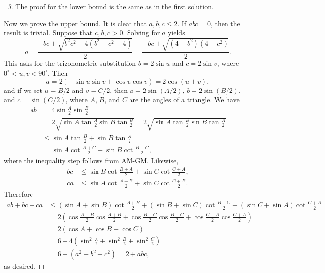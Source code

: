 \documentclass[12pt]{article}
\begin{document}
$$$$

\begin{proof}[\proofname\ 3]
 
The proof for the lower bound is the same as in the first solution.

Now we prove the upper bound. It is clear that $a,b,c\leq 2$. If $abc = 0$, then the result is trivial. Suppose that $a,b,c > 0$. Solving for $a$ yields
$$a = \frac{-bc + \sqrt{b^2c^2 - 4(b^2 + c^2 - 4)}}{2} = \frac{-bc + \sqrt{(4 - b^2)(4 - c^2)}}{2}.$$
This asks for the trigonometric substitution $b = 2\sin u$ and $c = 2\sin v$, where $0^\circ < u,v < 90^\circ$. Then
$$a = 2(-\sin u\sin v + \cos u\cos v) = 2\cos (u + v),$$
and if we set $u = B/2$ and $v = C/2$, then $a = 2\sin (A/2)$, $b = 2\sin (B/2)$, and $c = \sin (C/2)$, where $A$, $B$, and $C$ are the angles of a triangle. We have
$$\begin{align*}
ab &= 4\sin\frac{A}{2}\sin\frac{B}{2} \\
&= 2\sqrt{\sin A\tan\frac{A}{2}\sin B\tan\frac{B}{2}} = 2\sqrt{\sin A\tan\frac{B}{2}\sin B\tan\frac{A}{2}} \\
&\leq \sin A\tan\frac{B}{2} + \sin B\tan\frac{A}{2} \\
&= \sin A\cot\frac{A + C}{2} + \sin B\cot\frac{B + C}{2},
\end{align*}$$
where the inequality step follows from AM-GM. Likewise,
$$\begin{align*}
bc &\leq \sin B\cot\frac{B + A}{2} + \sin C\cot\frac{C + A}{2}, \\
ca &\leq \sin A\cot\frac{A + B}{2} + \sin C\cot\frac{C + B}{2}.
\end{align*}$$
Therefore
$$\begin{align*}
ab + bc + ca &\leq (\sin A + \sin B)\cot\frac{A + B}{2} + (\sin B + \sin C)\cot\frac{B + C}{2} + (\sin C + \sin A)\cot\frac{C + A}{2} \\
&= 2\left(\cos\frac{A - B}{2}\cos\frac{A + B}{2} + \cos\frac{B - C}{2}\cos\frac{B + C}{2} + \cos\frac{C - A}{2}\cos\frac{C + A}{2} \right)\\
&= 2(\cos A + \cos B + \cos C) \\
&= 6 - 4\left(\sin^2\frac{A}{2} + \sin^2\frac{B}{2} + \sin^2\frac{C}{2}\right) \\
&= 6 - (a^2 + b^2 + c^2) = 2 + abc,
\end{align*}$$
as desired.   
\end{proof}
\end{document}
